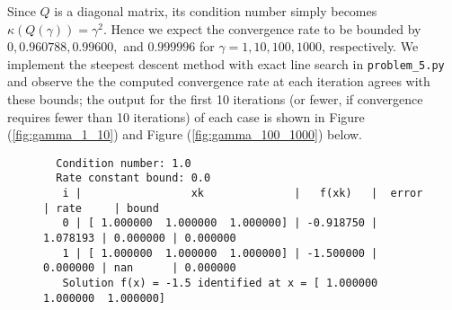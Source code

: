 \begin{solution}
    Since $Q$ is a diagonal matrix, its condition number simply becomes \linebreak $\kappa(Q(\gamma)) = \gamma^2$. Hence
    we expect the convergence rate to be bounded by $0, 0.960788, 0.99600,$ and $0.999996$ for 
    $\gamma = 1, 10, 100, 1000$, respectively. We implement the steepest descent method with exact line search in
    \texttt{problem\_5.py} and observe the the computed convergence rate at each iteration agrees with these bounds; the
    output for the first 10 iterations (or fewer, if convergence requires fewer than 10 iterations) of each case is 
    shown in Figure (\ref{fig:gamma_1_10}) and Figure (\ref{fig:gamma_100_1000}) below.
    
    \begin{figure}[h]
        \centering
        \begin{verbatim}
  Condition number: 1.0
  Rate constant bound: 0.0
   i |                 xk              |   f(xk)   |  error   | rate     | bound
   0 | [ 1.000000  1.000000  1.000000] | -0.918750 | 1.078193 | 0.000000 | 0.000000
   1 | [ 1.000000  1.000000  1.000000] | -1.500000 | 0.000000 | nan      | 0.000000
   Solution f(x) = -1.5 identified at x = [ 1.000000  1.000000  1.000000]
  

\end{verbatim}
\end{figure}
\end{solution}
